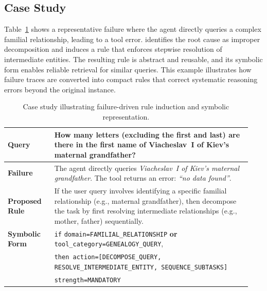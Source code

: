 \subsection{Case Study}

Table~\ref{tab:case-study} shows a representative failure where the agent directly queries a
complex familial relationship, leading to a tool error. \shortname identifies the root cause
as improper decomposition and induces a rule that enforces stepwise resolution of intermediate
entities. The resulting rule is abstract and reusable, and its symbolic form enables reliable
retrieval for similar queries. This example illustrates how failure traces are converted into
compact rules that correct systematic reasoning errors beyond the original instance.

\begin{table}[t]
\centering
\small
\caption{Case study illustrating failure-driven rule induction and symbolic representation.}
\label{tab:case-study}
\begin{tabular}{p{0.18\linewidth} p{0.76\linewidth}}
\toprule
\textbf{Query} &
How many letters (excluding the first and last) are there in the first name of
Viacheslav~I of Kiev's maternal grandfather? \\
\midrule
\textbf{Failure} &
The agent directly queries \textit{Viacheslav~I of Kiev's maternal grandfather}.
The tool returns an error: \textit{``no data found''}. \\
\midrule
\textbf{Proposed Rule} &
If the user query involves identifying a specific familial relationship (e.g., maternal
grandfather), then decompose the task by first resolving intermediate relationships
(e.g., mother, father) sequentially. \\
\midrule
\textbf{Symbolic Form} &
\texttt{if} \;
\texttt{domain=FAMILIAL\_RELATIONSHIP} \;\textbf{or}\;
\texttt{tool\_category=GENEALOGY\_QUERY}, \\
& \texttt{then action=[DECOMPOSE\_QUERY, RESOLVE\_INTERMEDIATE\_ENTITY, SEQUENCE\_SUBTASKS]} \\
& \texttt{strength=MANDATORY} \\
\bottomrule
\end{tabular}
\end{table}
